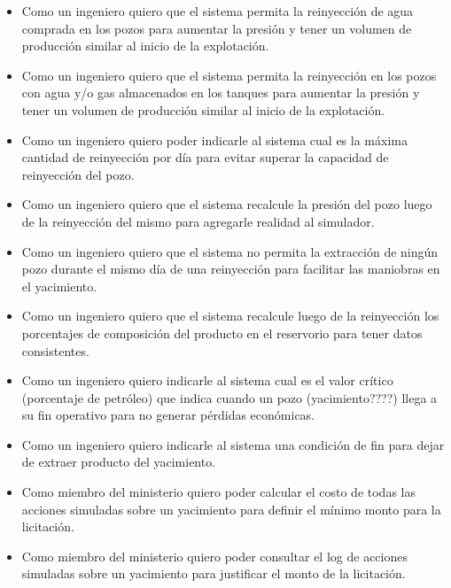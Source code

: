 \begin{itemize}
  \item Como un ingeniero quiero que el sistema permita la reinyección de agua comprada en los pozos para aumentar la presión y tener un volumen de producción similar al inicio de la explotación.
  \item Como un ingeniero quiero que el sistema permita la reinyección en los pozos con agua y/o gas almacenados en los tanques para aumentar la presión y tener un volumen de producción similar al inicio de la explotación.
  \item Como un ingeniero quiero poder indicarle al sistema cual es la máxima cantidad de reinyección por día para evitar superar la capacidad de reinyección del pozo.
  \item Como un ingeniero quiero que el sistema recalcule la presión del pozo luego de la reinyección del mismo para agregarle realidad al simulador.
  \item Como un ingeniero quiero que el sistema no permita la extracción de ningún pozo durante el mismo día de una reinyección para facilitar las maniobras en el yacimiento.
  \item Como un ingeniero quiero que el sistema recalcule luego de la reinyección los porcentajes de composición del producto en el reservorio para tener datos consistentes.
  \item Como un ingeniero quiero indicarle al sistema cual es el valor crítico (porcentaje de petróleo) que indica cuando un pozo (yacimiento????) llega a su fin operativo para no generar pérdidas económicas.
  \item Como un ingeniero quiero indicarle al sistema una condición de fin para dejar de extraer producto del yacimiento.
  \item Como miembro del ministerio quiero poder calcular el costo de todas las acciones simuladas sobre un yacimiento para definir el mínimo monto para la licitación.
  \item Como miembro del ministerio quiero poder consultar el log de acciones simuladas sobre un yacimiento para justificar el monto de la licitación.
\end{itemize}



